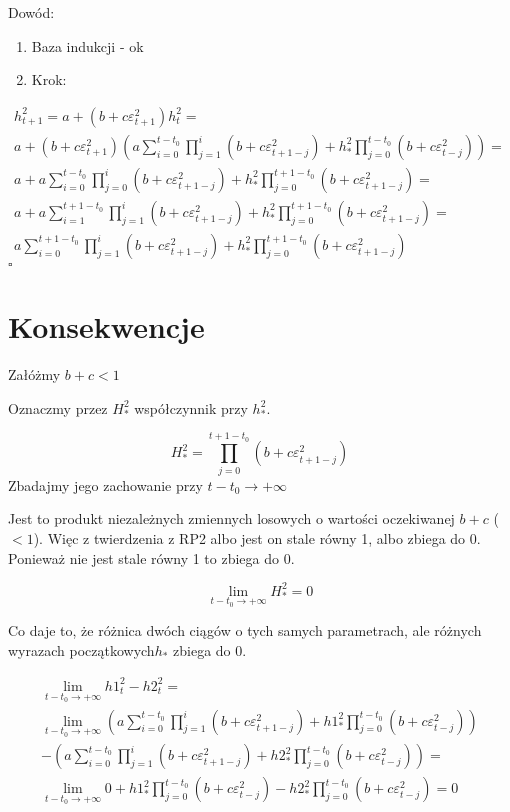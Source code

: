 \documentclass[12pt]{article}
\begin{document}
Dowód: \begin{enumerate}
\item Baza indukcji - ok
\item Krok:
\end{enumerate}
\begin{equation}
	\begin{aligned}
h_{t+1}^2 = a + (b+c\varepsilon_{t+1}^2)h_t^2 = \\
a + (b+c\varepsilon_{t+1}^2)(a\sum_{i=0}^{t-t_0}\prod_{j=1}^i(b+c\varepsilon_{t+1-j}^2) + h_*^2\prod_{j=0}^{t-t_0}(b+c\varepsilon_{t-j}^2)) = \\
a + a\sum_{i=0}^{t-t_0}\prod_{j=0}^i(b+c\varepsilon_{t+1-j}^2) + h_*^2\prod_{j=0}^{t+1-t_0}(b+c\varepsilon_{t+1-j}^2) = \\
a + a\sum_{i=1}^{t+1-t_0}\prod_{j=1}^i(b+c\varepsilon_{t+1-j}^2) + h_*^2\prod_{j=0}^{t+1-t_0}(b+c\varepsilon_{t+1-j}^2) = \\ 
a\sum_{i=0}^{t+1-t_0}\prod_{j=1}^i(b+c\varepsilon_{t+1-j}^2) + h_*^2\prod_{j=0}^{t+1-t_0}(b+c\varepsilon_{t+1-j}^2)
	\end{aligned}
\end{equation}
\hfill\ensuremath{\square}

\section{Konsekwencje}

Załóżmy $b+c < 1 $ 

Oznaczmy przez $H_*^2$ współczynnik przy $h_*^2$. 

\[
   H_*^2 = \prod_{j=0}^{t+1-t_0}(b+c\varepsilon_{t+1-j}^2)
\]
Zbadajmy jego zachowanie przy $t-t_0 \rightarrow +\infty$

Jest to produkt niezależnych zmiennych losowych o wartości oczekiwanej $b+c$ ($<1$). Więc z twierdzenia z RP2 albo jest on stale równy 1, albo zbiega do 0.
Ponieważ nie jest stale równy 1 to zbiega do 0.

\[
   \lim_{t-t_0 \rightarrow +\infty} H_*^2 = 0
\]


Co daje to, że różnica dwóch ciągów o tych samych parametrach, ale różnych wyrazach początkowych$h_*$ zbiega do 0. 

\begin{equation}
	\begin{aligned}
\lim_{t-t_0 \rightarrow +\infty} h1_t^2 - h2_t^2 = \\
 \lim_{t-t_0 \rightarrow +\infty} (a\sum_{i=0}^{t-t_0}\prod_{j=1}^i(b+c\varepsilon_{t+1-j}^2) + h1_*^2\prod_{j=0}^{t-t_0}(b+c\varepsilon_{t-j}^2)) \\
  - (a\sum_{i=0}^{t-t_0}\prod_{j=1}^i(b+c\varepsilon_{t+1-j}^2) + h2_*^2\prod_{j=0}^{t-t_0}(b+c\varepsilon_{t-j}^2)) = \\
  \lim_{t-t_0 \rightarrow +\infty} 0 + h1_*^2\prod_{j=0}^{t-t_0}(b+c\varepsilon_{t-j}^2) - h2_*^2\prod_{j=0}^{t-t_0}(b+c\varepsilon_{t-j}^2) = 0
	\end{aligned}
\end{equation}
\end{document}
